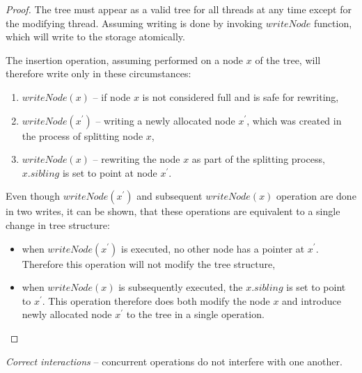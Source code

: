 \begin{proof}
  The tree must appear as a valid tree for all threads at any time except for the modifying thread. Assuming writing is done by invoking $writeNode$ function, which will write to the storage atomically.

  The insertion operation, assuming performed on a node $x$ of the tree, will therefore write only in these circumstances:

  \begin{enumerate}
    \item $writeNode(x)$ -- if node $x$ is not considered full and is safe for rewriting,
    \item $writeNode(x^\prime)$ -- writing a newly allocated node $x^\prime$, which was created in the process of splitting node $x$,
    \item $writeNode(x)$ -- rewriting the node $x$ as part of the splitting process, $x.sibling$ is set to point at node $x^\prime$.
  \end{enumerate}

  Even though $writeNode(x^\prime)$ and subsequent $writeNode(x)$ operation are done in two writes, it can be shown, that these operations are equivalent to a single change in tree structure:

  \begin{itemize}
    \item when $writeNode(x^\prime)$ is executed, no other node has a pointer at $x^\prime$. Therefore this operation will not modify the tree structure,
    \item when $writeNode(x)$ is subsequently executed, the $x.sibling$ is set to point to $x^\prime$. This operation therefore does both modify the node $x$ and introduce newly allocated node $x^\prime$ to the tree in a single operation.
  \end{itemize}
\end{proof}

\begin{theorem}
  \textit{Correct interactions} -- concurrent operations do not interfere with one another.
\end{theorem}


